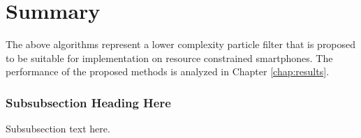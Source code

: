 \documentclass[10pt,journal,letterpaper,compsoc]{IEEEtran}
\begin{document}
\section{Summary}

The above algorithms represent a lower complexity particle filter that 
is proposed to be suitable for implementation on resource constrained 
smartphones. The performance of the proposed methods is analyzed in 
Chapter \ref{chap:results}.





\subsubsection{Subsubsection Heading Here}
Subsubsection text here.


%
%

\end{document}
